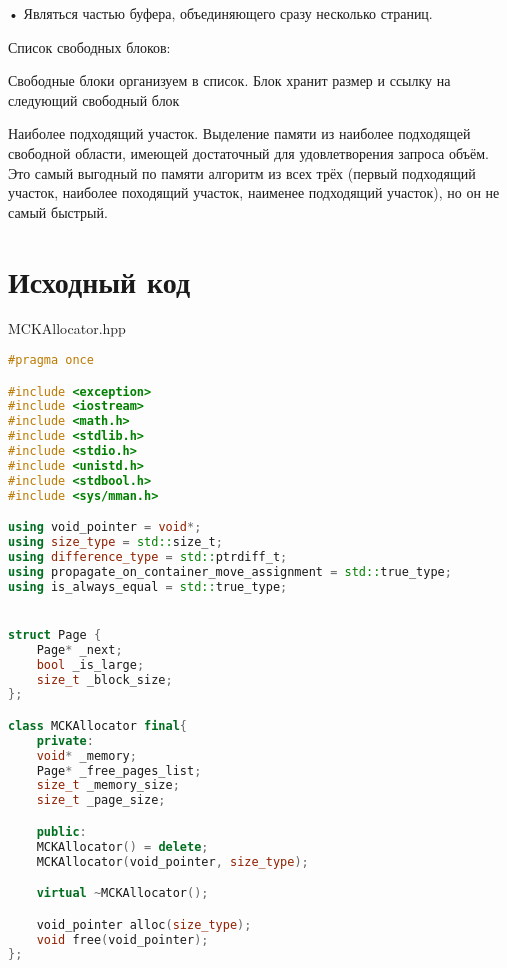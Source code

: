 \documentclass[a4paper, 12pt]{article}
\begin{document}
    •	Являться частью буфера, объединяющего сразу несколько страниц. 
    
    
Список свободных блоков:

Свободные блоки организуем в список. 
Блок хранит размер и ссылку на следующий свободный блок

Наиболее подходящий участок. Выделение памяти из наиболее подходящей свободной области, имеющей достаточный для удовлетворения запроса объём. Это самый выгодный по памяти алгоритм из всех трёх (первый подходящий участок, наиболее походящий участок, наименее подходящий участок), но он не самый быстрый.

\newpage

\section{Исходный код}
MCKAllocator.hpp
\begin{lstlisting}[language=C++]
#pragma once

#include <exception>
#include <iostream>
#include <math.h>
#include <stdlib.h>
#include <stdio.h>
#include <unistd.h>
#include <stdbool.h>
#include <sys/mman.h>

using void_pointer = void*;
using size_type = std::size_t;
using difference_type = std::ptrdiff_t;
using propagate_on_container_move_assignment = std::true_type;
using is_always_equal = std::true_type;


struct Page {
    Page* _next;
    bool _is_large;
    size_t _block_size;
};

class MCKAllocator final{
    private:
    void* _memory;
    Page* _free_pages_list;
    size_t _memory_size;
    size_t _page_size;

    public:
    MCKAllocator() = delete;
    MCKAllocator(void_pointer, size_type);

    virtual ~MCKAllocator();

    void_pointer alloc(size_type);
    void free(void_pointer);
};
\end{lstlisting}
\end{document}
